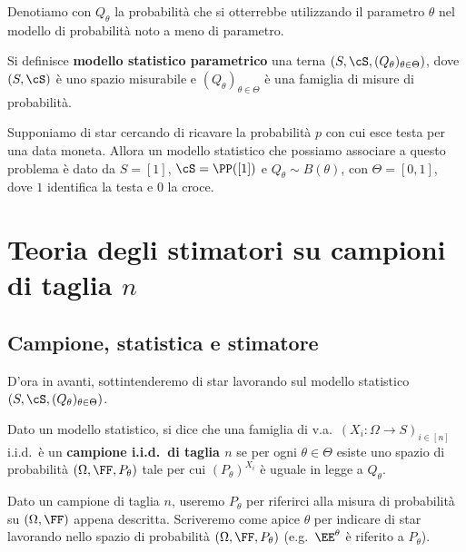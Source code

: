 \begin{multicols*}{2}
\begin{notation}
    Denotiamo con $Q_\theta$ la probabilità che si otterrebbe utilizzando il parametro $\theta$
    nel modello di probabilità noto a meno di parametro.
\end{notation}

\begin{definition}
    Si definisce \textbf{modello statistico parametrico} una terna $(S, \cS, (Q_\theta)_{\theta \in \Theta})$,
    dove $(S, \cS)$ è uno spazio misurabile e $(Q_\theta)_{\theta \in \Theta}$ è una famiglia di
    misure di probabilità.
\end{definition}

\begin{example}
    Supponiamo di star cercando di ricavare la probabilità $p$ con cui esce testa per una data moneta. Allora
    un modello statistico che possiamo associare a questo problema è dato da $S = [1]$, $\cS = \PP([1])$ e
    $Q_\theta \sim B(\theta)$, con $\Theta = [0, 1]$, dove $1$ identifica la testa e $0$ la croce.
\end{example}

\section{Teoria degli stimatori su campioni di taglia \texorpdfstring{$n$}{n}}

\subsection{Campione, statistica e stimatore}

D'ora in avanti, sottintenderemo di star lavorando sul modello
statistico $(S, \cS, (Q_\theta)_{\theta \in \Theta})$.

\begin{definition}
    Dato un modello statistico, si dice
    che una famiglia di v.a.~$(X_i : \Omega \to S)_{i \in [n]}$ i.i.d.~è un \textbf{campione i.i.d.~di taglia $n$}
    se per ogni $\theta \in \Theta$ esiste uno spazio di probabilità $(\Omega, \FF, P_\theta)$ tale per cui
    $(P_\theta)^{X_i}$ è uguale in legge a $Q_\theta$.
\end{definition}

Dato un campione di taglia $n$, useremo $P_\theta$ per riferirci alla misura di probabilità
su $(\Omega, \FF)$ appena descritta. Scriveremo
come apice $\theta$ per indicare di star lavorando nello spazio
di probabilità $(\Omega, \FF, P_\theta)$ (e.g.~$\EE^\theta$ è riferito
a $P_\theta$).


\end{multicols*}
